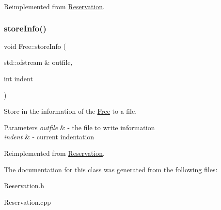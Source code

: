 Reimplemented from \mbox{\hyperlink{class_reservation_acff32024a350c2156af9f74522c59b7b}{Reservation}}.

\mbox{\label{class_free_a5eec9da16ebf4f388d16dd270bd93b64}} 
\subsubsection{\texorpdfstring{store\+Info()}{storeInfo()}}
{\footnotesize\ttfamily void Free\+::store\+Info (\begin{DoxyParamCaption}\item[{std\+::ofstream \&}]{outfile,  }\item[{int}]{indent }\end{DoxyParamCaption})\hspace{0.3cm}{\ttfamily [virtual]}}



Store in the information of the \mbox{\hyperlink{class_free}{Free}} to a file. 


\begin{DoxyParams}{Parameters}
{\em outfile} & -\/ the file to write information \\
\hline
{\em indent} & -\/ current indentation \\
\hline
\end{DoxyParams}


Reimplemented from \mbox{\hyperlink{class_reservation_a8ec83fe2eb15294c3a51a9998ed17df7}{Reservation}}.



The documentation for this class was generated from the following files\+:\begin{DoxyCompactItemize}
\item 
Reservation.\+h\item 
Reservation.\+cpp\end{DoxyCompactItemize}
